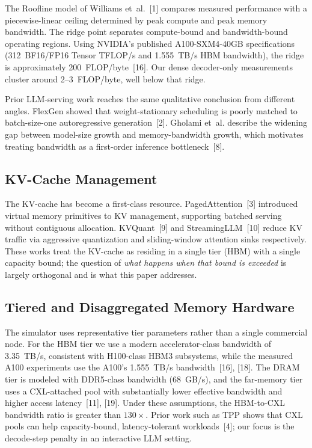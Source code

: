 \documentclass[conference]{IEEEtran}
\begin{document}
The Roofline model of Williams et~al.~[1] compares measured performance with a piecewise-linear ceiling determined by peak compute and peak memory bandwidth. The ridge point separates compute-bound and bandwidth-bound operating regions. Using NVIDIA's published A100-SXM4-40GB specifications (312~BF16/FP16 Tensor TFLOP/s and 1.555~TB/s HBM bandwidth), the ridge is approximately 200~FLOP/byte~[16]. Our dense decoder-only measurements cluster around 2--3~FLOP/byte, well below that ridge.

Prior LLM-serving work reaches the same qualitative conclusion from different angles. FlexGen showed that weight-stationary scheduling is poorly matched to batch-size-one autoregressive generation~[2]. Gholami et~al. describe the widening gap between model-size growth and memory-bandwidth growth, which motivates treating bandwidth as a first-order inference bottleneck~[8].

\subsection{KV-Cache Management}

The KV-cache has become a first-class resource. PagedAttention~[3] introduced virtual memory primitives to KV management, supporting batched serving without contiguous allocation. KVQuant~[9] and StreamingLLM~[10] reduce KV traffic via aggressive quantization and sliding-window attention sinks respectively. These works treat the KV-cache as residing in a single tier (HBM) with a single capacity bound; the question of \emph{what happens when that bound is exceeded} is largely orthogonal and is what this paper addresses.

\subsection{Tiered and Disaggregated Memory Hardware}

The simulator uses representative tier parameters rather than a single commercial node. For the HBM tier we use a modern accelerator-class bandwidth of 3.35~TB/s, consistent with H100-class HBM3 subsystems, while the measured A100 experiments use the A100's 1.555~TB/s bandwidth~[16], [18]. The DRAM tier is modeled with DDR5-class bandwidth (68~GB/s), and the far-memory tier uses a CXL-attached pool with substantially lower effective bandwidth and higher access latency~[11], [19]. Under these assumptions, the HBM-to-CXL bandwidth ratio is greater than $130\times$. Prior work such as TPP shows that CXL pools can help capacity-bound, latency-tolerant workloads~[4]; our focus is the decode-step penalty in an interactive LLM setting.
\end{document}
